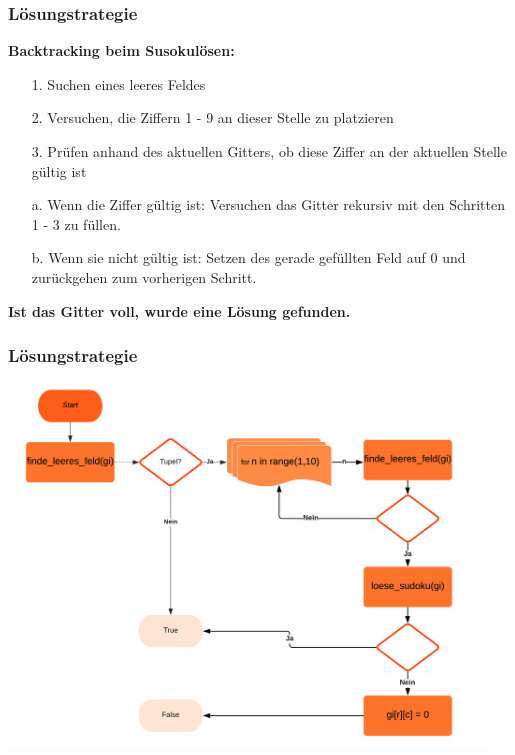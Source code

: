 \documentclass{beamer}
\begin{document}
\begin{frame}
	\frametitle{Lösungstrategie} 

	\textbf{Backtracking beim Susokulösen:}
	
	\begin{itemize}
		\item [1.] Suchen eines leeres Feldes
\item [2.] Versuchen, die Ziffern 1 - 9 an dieser Stelle zu platzieren
	\item [3.] Prüfen anhand des aktuellen Gitters, ob diese Ziffer an der aktuellen Stelle gültig ist
	\item [a.] Wenn die Ziffer gültig ist: Versuchen das Gitter rekursiv mit den Schritten 1 - 3 zu füllen.
	\item [b.] Wenn sie nicht gültig ist: Setzen des gerade gefüllten Feld auf 0 und zurückgehen zum vorherigen Schritt.
	\end{itemize}
	\textbf{Ist das Gitter voll, wurde eine Lösung gefunden.}
\end{frame}

\begin{frame}
	\frametitle{Lösungstrategie} 
		\centering
	\includegraphics[width=0.95\textwidth]{img/flow.png}
\end{frame}
\end{document}
